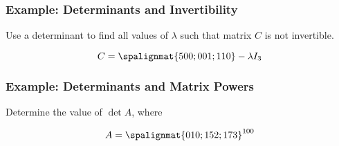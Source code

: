 \begin{frame}\frametitle{Example: Determinants and Invertibility}

    Use a determinant to find all values of $\lambda$ such that matrix $C$ is not invertible. 

    $$C = \spalignmat{5 0 0;0 0 1; 1 1 0} - \lambda I_3$$

\end{frame}


\begin{frame}\frametitle{Example: Determinants and Matrix Powers}

    Determine the value of $\operatorname{det} A$, where

    $$ A =  \spalignmat{0 1 0;1 5 2;1 7 3} ^{100}  $$

\end{frame}




